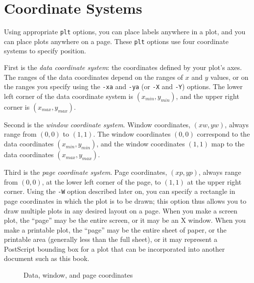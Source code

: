 \documentclass{book}
\begin{document}
\chapter{Coordinate Systems \label{sec:coord-systems}}

Using appropriate {\tt plt} options, you can place labels anywhere in
a plot, and you can place plots anywhere on a page.  These {\tt plt}
options use four coordinate systems to specify position.

%
%
%
%
%
First is the {\em data coordinate system}: the coordinates defined by your
plot's axes.  The ranges of the data coordinates depend on the ranges of $x$
and $y$ values, or on the ranges you specify using the {\tt -xa} and {\tt -ya}
(or {\tt -X} and {\tt -Y}) options.  The lower left corner of the data
coordinate system is $(x_{min},y_{min})$, and the upper right corner is
$(x_{max},y_{max})$.

%
Second is the {\em window coordinate system}.  Window coordinates, $(xw,yw)$,
always range from $(0,0)$ to $(1,1)$.  The window coordinates $(0,0)$
correspond to the data coordinates $(x_{min},y_{min})$, and the window
coordinates $(1,1)$ map to the data coordinates $(x_{max},y_{max})$.

%
%
%
%
Third is the {\em page coordinate system}.  Page coordinates, $(xp,yp)$, always
range from $(0,0)$, at the lower left corner of the page, to $(1,1)$ at the
upper right corner.  Using the {\tt -W} option described later on, you can
specify a rectangle in page coordinates in which the plot is to be drawn; this
option thus allows you to draw multiple plots in any desired layout on a page.
When you make a screen plot, the ``page'' may be the entire screen, or it may
be an X window.  When you make a printable plot, the ``page'' may be the entire
sheet of paper, or the printable area (generally less than the full sheet), or
it may represent a PostScript bounding box for a plot that can be incorporated
into another document such as this book.

\begin{figure}
\begin{center}
\end{center}
\caption{Data, window, and page coordinates \label{fig:coords}}
\end{figure}
\end{document}
